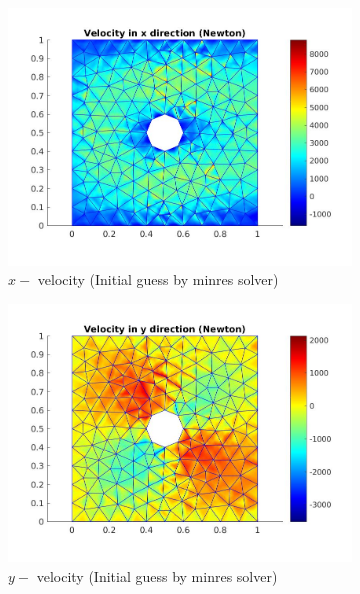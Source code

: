 \documentclass[a4paper]{book}
\begin{document}
\begin{figure}
\begin{subfigure}{0.5\textwidth}	
  \includegraphics[width=\linewidth]{cylinder_newton_vx_minres.jpg}
  \caption{$x-$ velocity (Initial guess by minres solver)}
  \label{x_vel_navier_stoke_minres}
\end{subfigure}
\begin{subfigure}{0.5\textwidth}	
  \includegraphics[width=\linewidth]{cylinder_newton_vy_minres.jpg}
  \caption{$y-$ velocity (Initial guess by minres solver)}
  \label{y_vel_navier_stoke_minres}
\end{subfigure}
\begin{subfigure}{\textwidth}	

\end{subfigure}
\end{figure}
\end{document}
